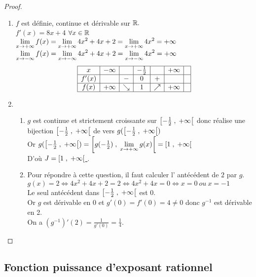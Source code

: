 \begin{example}
\begin{exercice}
\end{exercice}
\begin{proof}
\begin{enumerate}
\item $ f $ est définie, continue et dérivable sur $ \mathbb{R}. $\\
$ f'(x) = 8x+4$  $\forall x\in \mathbb{R} $\\
$\displaystyle \lim_{x \to +\infty}f(x)= \displaystyle\lim_{x \to +\infty}4x^{2}+4x+2=\displaystyle\lim_{x \to +\infty}4x^{2}=+\infty$\\
$\displaystyle \lim_{x \to -\infty}f(x)=\displaystyle \lim_{x \to -\infty}4x^{2}+4x+2=\displaystyle\lim_{x \to -\infty}4x^{2}=+\infty$
$$
\begin{array}{|c|c|c|c|c|c|c|}
\hline
x & -\infty & & -\frac{1}{2} & & +\infty & \\
\hline
f'(x) & & - & 0 & + & & \\
\hline
f(x) & +\infty & \searrow & 1 & \nearrow & +\infty & \\
\hline
\end{array}
$$
\item 
\begin{enumerate}
\item $ g $ est continue et strictement croissante  sur  $ \left[-\frac{1}{2} \;,\; +\infty\right[ $ donc réalise une bijection $ \left[-\frac{1}{2} \;,\; +\infty\right[ $ de vers  $g( \left[-\frac{1}{2} \;,\; +\infty\right[)$ \\Or  $g( \left[-\frac{1}{2} \;,\; +\infty\right[)=\left[g(-\frac{1}{2}) \;,\; \displaystyle\lim_{x \to +\infty}g(x)\right[=\left[1 \;,\; +\infty\right[ $ \\ D'où \underline{$J= \left[1 \;,\; +\infty\right[ $ }.
\item Pour répondre à cette question, il  faut calculer  l' antécédent de $ 2 $ par $ g. $\\ $ g(x)=2\Leftrightarrow 4x^{2}+4x+2=2\Leftrightarrow 4x^{2}+4x=0\Leftrightarrow x= 0 \ ou\  x= -1$\\ Le seul antécédent dans $ \left[-\frac{1}{2} \;,\; +\infty\right[ $ est  0.\\
Or $ g $ est dérivable en 0 et $ g'(0)=f'(0)=4 \neq 0 $ donc  $ g^{-1} $  est dérivable en 2.\\
On a $(g^{-1})'(2)=\frac{1}{g'(0)}=\frac{1}{4}.  $
\end{enumerate}

\end{enumerate}
\end{proof}
\subsection{Fonction puissance d'exposant rationnel}


\end{example}
